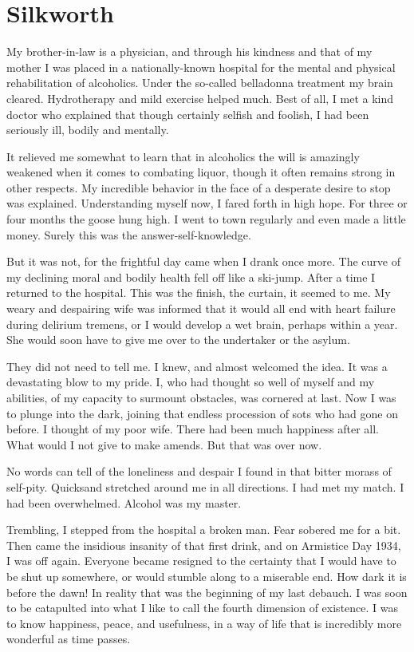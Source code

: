 \section{Silkworth}

My brother-in-law is a physician, and through his kindness and that of my mother I was placed in a nationally-known hospital for the mental and physical rehabilitation of alcoholics.
Under the so-called belladonna treatment my brain cleared.
Hydrotherapy and mild exercise helped much.
Best of all, I met a kind doctor who explained that though certainly selfish and foolish, I had been seriously ill, bodily and mentally.

It relieved me somewhat to learn that in alcoholics the will is amazingly weakened when it comes to combating liquor, though it often remains strong in other respects.
My incredible behavior in the face of a desperate desire to stop was explained.
Understanding myself now, I fared forth in high hope.
For three or four months the goose hung high.
I went to town regularly and even made a little money.
Surely this was the answer-self-knowledge.

But it was not, for the frightful day came when I drank once more.
The curve of my declining moral and bodily health fell off like a ski-jump.
After a time I returned to the hospital.
This was the finish, the curtain, it seemed to me.
My weary and despairing wife was informed that it would all end with heart failure during delirium tremens, or I would develop a wet brain, perhaps within a year.
She would soon have to give me over to the undertaker or the asylum.

They did not need to tell me.
I knew, and almost welcomed the idea.
It was a devastating blow to my pride.
I, who had thought so well of myself and my abilities, of my capacity to surmount obstacles, was cornered at last.
Now I was to plunge into the dark, joining that endless procession of sots who had gone on before.
I thought of my poor wife.
There had been much happiness after all.
What would I not give to make amends.
But that was over now.

No words can tell of the loneliness and despair I found in that bitter morass of self-pity.
Quicksand stretched around me in all directions.
I had met my match.
I had been overwhelmed.
Alcohol was my master.

Trembling, I stepped from the hospital a broken man.
Fear sobered me for a bit.
Then came the insidious insanity of that first drink, and on Armistice Day 1934, I was off again.
Everyone became resigned to the certainty that I would have to be shut up somewhere, or would stumble along to a miserable end.
How dark it is before the dawn!
In reality that was the beginning of my last debauch.
I was soon to be catapulted into what I like to call the fourth dimension of existence.
I was to know happiness, peace, and usefulness, in a way of life that is incredibly more wonderful as time passes.


